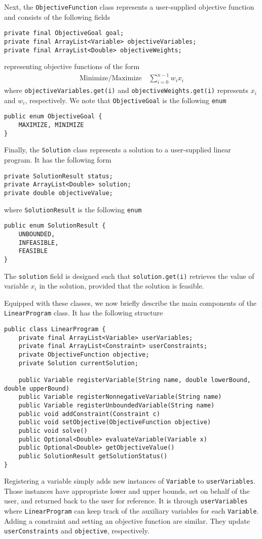 \documentclass{article}
\newcommand{\javaCode}[1]{\texttt{#1}}
\begin{document}
Next, the \javaCode{ObjectiveFunction} class represents a user-supplied objective function and consists of the following fields
\begin{verbatim}
private final ObjectiveGoal goal;
private final ArrayList<Variable> objectiveVariables;
private final ArrayList<Double> objectiveWeights;
\end{verbatim}
representing objective functions of the form
\begin{align*}
    \text{Minimize/Maximize} \quad \sum_{i=0}^{n-1} w_i x_i
\end{align*}
where \javaCode{objectiveVariables.get(i)} and \javaCode{objectiveWeights.get(i)} represents $x_i$ and $w_i$, respectively. We note that \javaCode{ObjectiveGoal} is the following \javaCode{enum}
\begin{verbatim}
public enum ObjectiveGoal {
    MAXIMIZE, MINIMIZE
}
\end{verbatim}

Finally, the \javaCode{Solution} class represents a solution to a user-supplied linear program. It has the following form
\begin{verbatim}
private SolutionResult status;
private ArrayList<Double> solution;
private double objectiveValue;
\end{verbatim}
where \javaCode{SolutionResult} is the following \javaCode{enum}
\begin{verbatim}
public enum SolutionResult {
    UNBOUNDED,
    INFEASIBLE,
    FEASIBLE
}
\end{verbatim}
The \javaCode{solution} field is designed such that \javaCode{solution.get(i)} retrieves the value of variable $x_i$ in the solution, provided that the solution is feasible.

Equipped with these classes, we now briefly describe the main components of the \javaCode{LinearProgram} class. It has the following structure
\begin{verbatim}
public class LinearProgram {
    private final ArrayList<Variable> userVariables;
    private final ArrayList<Constraint> userConstraints;
    private ObjectiveFunction objective;
    private Solution currentSolution;
    
    public Variable registerVariable(String name, double lowerBound, double upperBound)
    public Variable registerNonnegativeVariable(String name)
    public Variable registerUnboundedVariable(String name)
    public void addConstraint(Constraint c)
    public void setObjective(ObjectiveFunction objective)
    public void solve()
    public Optional<Double> evaluateVariable(Variable x)
    public Optional<Double> getObjectiveValue()
    public SolutionResult getSolutionStatus()
}
\end{verbatim}
Registering a variable simply adds new instances of \javaCode{Variable} to \javaCode{userVariables}. Those instances have appropriate lower and upper bounds, set on behalf of the user, and returned back to the user for reference. It is through \javaCode{userVariables} where \javaCode{LinearProgram} can keep track of the auxiliary variables for each \javaCode{Variable}. Adding a constraint and setting an objective function are similar. They update \javaCode{userConstraints} and \javaCode{objective}, respectively. 
\end{document}
